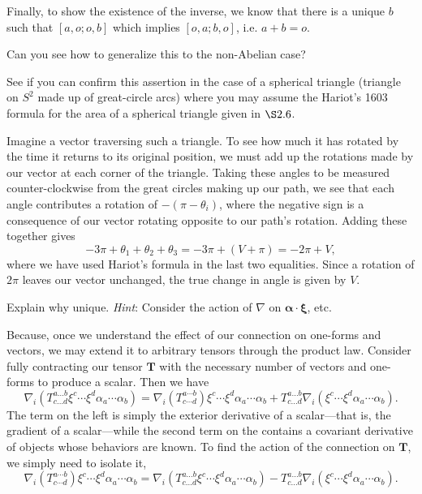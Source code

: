 \documentclass[../the-road-to-reality.tex]{subfiles}
\begin{document}
\begin{questions}
\begin{solution}
		Finally, to show the existence of the inverse, we know that there is a unique $b$ such that $[a, o; o, b]$ which implies $[o, a; b, o]$, i.e. $a + b = o$. 
	\end{solution}

	\question Can you see how to generalize this to the non-Abelian case?

	\question See if you can confirm this assertion in the case of a spherical triangle (triangle on $S^2$ made up of great-circle arcs) where you may assume the Hariot's 1603 formula for the area of a spherical triangle given in $\S2.6$.

	\begin{solution}
		Imagine a vector traversing such a triangle. To see how much it has rotated by the time it returns to its original position, we must add up the rotations made by our vector at each corner of the triangle. Taking these angles to be measured counter-clockwise from the great circles making up our path, we see that each angle contributes a rotation of $-(\pi - \theta_i)$, where the negative sign is a consequence of our vector rotating opposite to our path's rotation. Adding these together gives
		\[
			-3\pi + \theta_1 + \theta_2 + \theta_3 = -3\pi + (V + \pi) = -2\pi + V
		,\] 
		where we have used Hariot's formula in the last two equalities. Since a rotation of $2\pi$ leaves our vector unchanged, the true change in angle is given by $V$.
	\end{solution}

	\question Explain why unique. \textit{Hint}: Consider the action of $\nabla$ on $\mathbf{\alpha}\cdot\mathbf{\xi}$, etc.

	\begin{solution}
		Because, once we understand the effect of our connection on one-forms and vectors, we may extend it to arbitrary tensors through the product law. Consider fully contracting our tensor $\mathbf{T}$ with the necessary number of vectors and one-forms to produce a scalar. Then we have
		\[
			\nabla_i(T^{a\dots{b}}_{c\dots{d}}\xi^c\cdots\xi^d\alpha_a\cdots\alpha_b) = \nabla_i(T^{a\cdots{b}}_{c\cdots{d}})\xi^c\cdots\xi^d\alpha_a\cdots\alpha_b + T^{a\dots{b}}_{c\dots{d}}\nabla_i(\xi^c\cdots\xi^d\alpha_a\cdots\alpha_b)
		.\] 
		The term on the left is simply the exterior derivative of a scalar---that is, the gradient of a scalar---while the second term on the contains a covariant derivative of objects whose behaviors are known. To find the action of the connection on $\mathbf{T}$, we simply need to isolate it,
		\[
		 \nabla_i(T^{a\cdots{b}}_{c\cdots{d}})\xi^c\cdots\xi^d\alpha_a\cdots\alpha_b = \nabla_i(T^{a\dots{b}}_{c\dots{d}}\xi^c\cdots\xi^d\alpha_a\cdots\alpha_b) - T^{a\dots{b}}_{c\dots{d}}\nabla_i(\xi^c\cdots\xi^d\alpha_a\cdots\alpha_b)
		.\] 
	\end{solution}


\end{questions}
\end{document}
